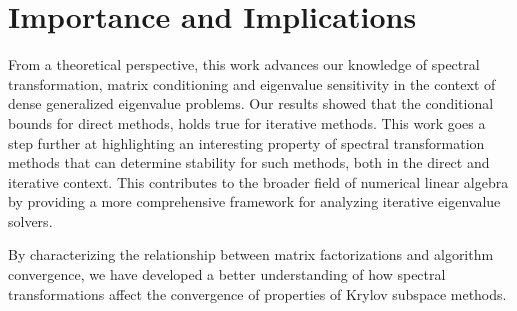 \section{Importance and Implications}
From a theoretical perspective, this work advances our knowledge of spectral transformation, matrix conditioning and eigenvalue sensitivity in the context of dense generalized eigenvalue problems. Our results showed that the conditional bounds for direct methods, holds true for iterative methods. This work goes a step further at highlighting an interesting property of spectral transformation methods that can determine stability for such methods, both in the direct and iterative context. This contributes to the broader field of numerical linear algebra by providing a more comprehensive framework for analyzing iterative eigenvalue solvers.

By characterizing the relationship between matrix factorizations and algorithm convergence, we have developed a better understanding of how spectral transformations affect the convergence of properties of Krylov subspace methods.
